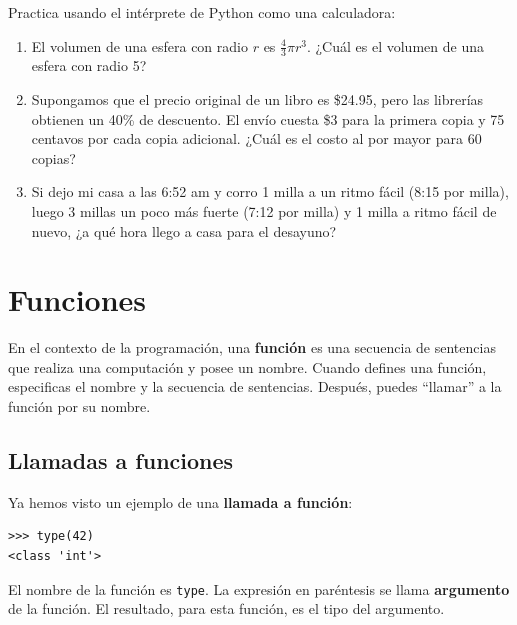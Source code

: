\documentclass[10pt]{book}
\begin{document}
\begin{exercise}

Practica usando el intérprete de Python como una calculadora:

\begin{enumerate}

\item El volumen de una esfera con radio $r$ es $\frac{4}{3} \pi r^3$.
  ¿Cuál es el volumen de una esfera con radio 5?

\item Supongamos que el precio original de un libro es \$24.95, pero las librerías obtienen
  un 40\% de descuento.  El envío cuesta \$3 para la primera copia y 75 centavos
  por cada copia adicional.  ¿Cuál es el costo al por mayor para
  60 copias?

\item Si dejo mi casa a las 6:52 am y corro 1 milla a un ritmo fácil
  (8:15 por milla), luego 3 millas un poco más fuerte (7:12 por milla) y 1 milla
  a ritmo fácil de nuevo, ¿a qué hora llego a casa para el desayuno?

\end{enumerate}
\end{exercise}


\chapter{Funciones}
\label{funcchap}

En el contexto de la programación, una {\bf función} es una secuencia de sentencias
que realiza una computación y posee un nombre.  Cuando defines una función,
especificas el nombre y la secuencia de sentencias.  Después, puedes
``llamar'' a la función por su nombre.

\section{Llamadas a funciones}
\label{functionchap}

Ya hemos visto un ejemplo de una {\bf llamada a función}:

\begin{verbatim}
>>> type(42)
<class 'int'>
\end{verbatim}
%
El nombre de la función es {\tt type}.  La expresión en paréntesis
se llama {\bf argumento} de la función.  El resultado, para esta
función, es el tipo del argumento.
\end{document}
